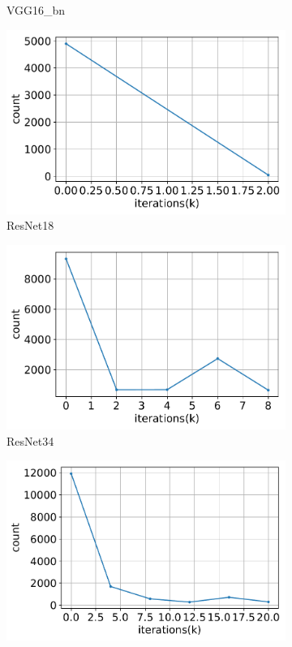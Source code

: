 \documentclass{article}
\begin{document}
\begin{figure}[t]
\begin{subfigure}{.32\textwidth}
    \caption{VGG16\_bn}
  \end{subfigure}
  \begin{subfigure}{.32\textwidth}
    \includegraphics[width=\textwidth]{NeuRIPS2019/images/WOT_new/resnet18_counts.pdf}
    \caption{ResNet18}
  \end{subfigure}
    \begin{subfigure}{.32\textwidth}
    \includegraphics[width=\textwidth]{NeuRIPS2019/images/WOT_new/resnet34_counts.pdf}
    \caption{ResNet34}
  \end{subfigure}
  \begin{subfigure}{.32\textwidth}
    \includegraphics[width=\textwidth]{NeuRIPS2019/images/WOT_new/resnet50_counts.pdf}

\end{subfigure}
\end{figure}
\end{document}
